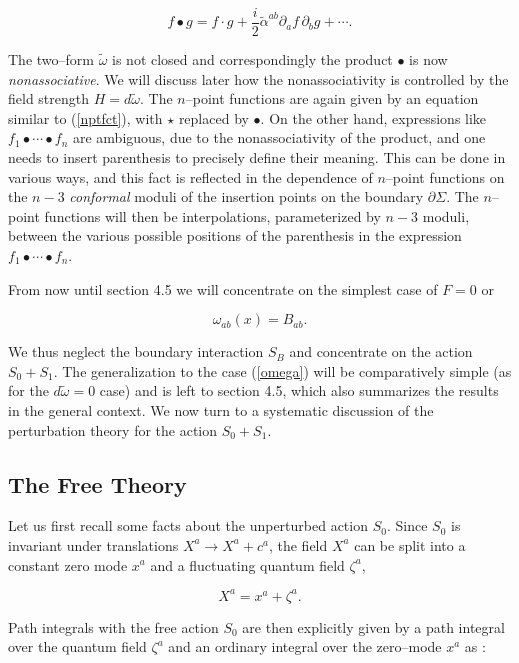 \documentclass[a4paper,11pt]{article}
\begin{document}
$$
f \bullet g = f\cdot g + \frac{i}{2}\widetilde{\alpha}^{ab}\partial_{a}f
\,\partial_{b}g + \cdots .
$$

\noindent
The two--form $\widetilde{\omega}$ is not closed and correspondingly the
product $\bullet $ is now \textit{nonassociative}. We will discuss later
how the nonassociativity is controlled by the field strength $H =
d\widetilde{\omega}$. The $n$--point functions are again given by an
equation similar to (\ref{nptfct}), with $\star$ replaced by $\bullet$. On
the other hand, expressions like $f_{1}\bullet \cdots \bullet f_{n}$ are
ambiguous, due to the nonassociativity of the product, and one needs to
insert parenthesis to precisely define their meaning. This can be done in
various ways, and this fact is reflected in the dependence of $n$--point
functions on the $n-3$ \textit{conformal} moduli of the insertion points on
the boundary $\partial \Sigma$. The $n$--point functions will then be
interpolations, parameterized by $n-3$ moduli, between the various possible
positions of the parenthesis in the expression $f_{1}\bullet \cdots \bullet
f_{n}$.

From now until section 4.5 we will concentrate on the simplest case of 
$F=0$ or

$$
\omega _{ab}\left( x\right) =B_{ab}.
$$

\noindent
We thus neglect the boundary interaction $S_{B}$ and concentrate on the
action $S_{0} + S_{1}$. The generalization to the case (\ref{omega}) will be
comparatively simple (as for the $d\widetilde\omega = 0$ case)
and is left to section 4.5, which also summarizes
the results in the general context. We now turn to a systematic discussion
of the perturbation theory for the action $S_{0} + S_{1}$.


\subsection{The Free Theory}


Let us first recall some facts about the unperturbed action $S_{0}$. Since 
$S_{0}$ is invariant under translations $X^{a}\rightarrow X^{a}+c^{a}$, the
field $X^{a}$ can be split into a constant zero mode $x^{a}$ and a
fluctuating quantum field $\zeta^{a}$,

\begin{equation}
X^{a}=x^{a}+\zeta ^{a}.
\label{split}
\end{equation}

\noindent
Path integrals with the free action $S_{0}$ are then explicitly given by a
path integral over the quantum field $\zeta^{a}$ and an ordinary integral
over the zero--mode $x^{a}$ as \cite{Fradkin-Tseytlin}:
\end{document}

